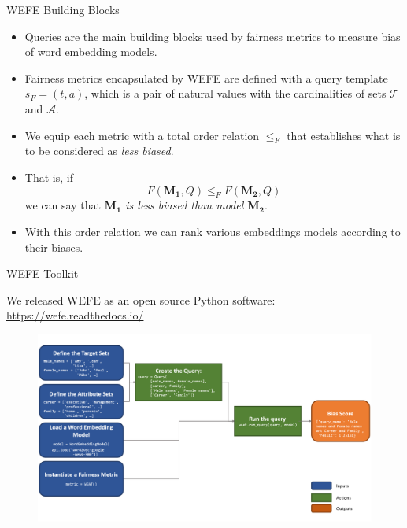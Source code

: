 \documentclass[handout]{beamer}
\begin{document}
\begin{frame}{WEFE Building Blocks}
\begin{scriptsize}
\begin{itemize}

\item Queries are the main building blocks used by fairness metrics to measure bias of word embedding models.

\item Fairness metrics encapsulated by WEFE are defined with a query template $s_F=(t,a)$, which is a pair of natural values  with the cardinalities of sets $\mathcal{T}$ and $\mathcal{A}$.

\item We equip each metric with a total order relation $\leq_F$ that establishes what is to be considered as \emph{less biased}.


\item That is, if
\begin{displaymath}
 F(\mathbf{M_1},Q)\leq_F F(\mathbf{M_2},Q)
\end{displaymath}
we can say that \emph{$\mathbf{M_1}$ is less biased than model $\mathbf{M_2}$}.

\item With this order relation we can rank various embeddings models according to their biases.

 \end{itemize}


\end{scriptsize}
\end{frame}


\begin{frame}{WEFE Toolkit}
\scriptsize{We released WEFE as an open source Python software:
\url{https://wefe.readthedocs.io/}

  \begin{figure}[h]
        	\includegraphics[scale = 0.22]{pics/wefedia.png}
        \end{figure}


        }

\end{frame}
\end{document}

